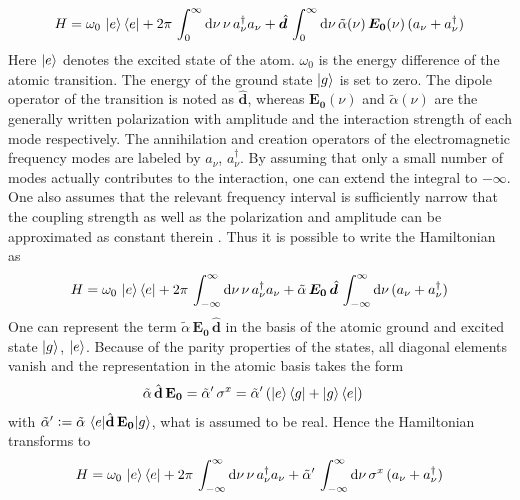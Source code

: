 \begin{align*}
    H= {\omega_0}\,\ket{e}\bra{e}+2\pi\,\int_{0}^\infty\text{d}\nu\,\nu\,a^\dagger_\nu a_\nu+ \hat{\boldsymbol{d}}\,\int_{0}^\infty\text{d}\nu\,\tilde{\alpha}(\nu)\,\boldsymbol{E_0}(\nu)\,(a_\nu+a^\dagger_\nu)
\end{align*}
Here $\ket{e}$ denotes the excited state of the atom. $\omega_0$ is the energy difference of the atomic transition. The energy of the ground state $\ket{g}$ is set to zero. The dipole operator of the transition is noted as $\hat{\mathbf{d}}$, whereas $\mathbf{E_0}(\nu)$ and $\tilde{\alpha}(\nu)$ are the generally written polarization with amplitude and the interaction strength of each mode respectively. The annihilation and creation operators of the electromagnetic frequency modes are labeled by $a_\nu$, $a_\nu^\dagger$. By assuming that only a small number of modes actually contributes to the interaction, one can extend the integral to $-\infty$. One also assumes that the relevant frequency interval is sufficiently narrow that the coupling strength as well as the polarization and amplitude can be approximated as constant therein \cite{ciccarello_quantum_2022,gross_qubit_2018}. Thus it is possible to write the Hamiltonian as
\begin{align*}
    H= {\omega_0}\,\ket{e}\bra{e}+2\pi\,\int_{-\infty}^\infty\text{d}\nu\,\nu\,a^\dagger_\nu a_\nu+ \tilde{\alpha}\,\boldsymbol{E_0}\,\hat{\boldsymbol{d}}\,\int_{-\infty}^\infty\text{d}\nu\,(a_\nu+a^\dagger_\nu)
\end{align*}
One can represent the term $\tilde{\alpha}\,\mathbf{E_0}\,\hat{\mathbf{d}}$ in the basis of the atomic ground and excited state $\ket{g}$, $\ket{e}$. Because of the parity properties of the states, all diagonal elements vanish and the representation in the atomic basis takes the form
\begin{align*}
    \tilde{\alpha}\,\hat{\mathbf{d}}\,\mathbf{E_0}&= \tilde{\alpha}'\,\sigma^x=\tilde{\alpha}'\,(\ket{e}\bra{g}+\ket{g}\bra{e})
\end{align*}
with $\tilde{\alpha}'\vcentcolon=\tilde{\alpha}\,\braket{e|\hat{\mathbf{d}}\,\mathbf{E_0}|g}$, what is assumed to be real. Hence the Hamiltonian transforms to
\begin{align*}
    H= {\omega_0}\,\ket{e}\bra{e}+2\pi\,\int_{-\infty}^\infty\text{d}\nu\,\nu\,a^\dagger_\nu a_\nu+ \tilde{\alpha}'\,\int_{-\infty}^\infty\text{d}\nu\,\sigma^x\,(a_\nu+a^\dagger_\nu)
\end{align*}
